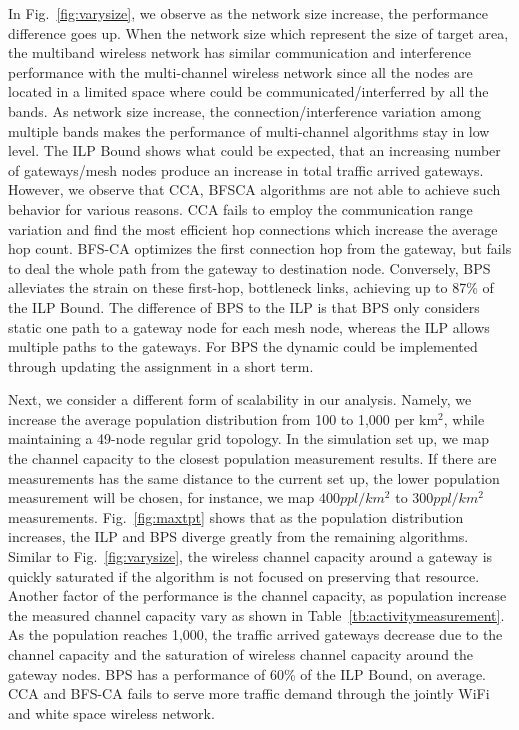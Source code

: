 In Fig.~\ref{fig:varysize}, we observe as the network size increase, the performance
difference goes up. When the network size which represent the size of target area, 
the multiband wireless network has similar communication and interference performance
with the multi-channel wireless network since all the nodes are located in a limited 
space where could be communicated/interferred by all the bands. As network size increase,
the connection/interference variation among multiple bands makes the performance of 
multi-channel algorithms stay in low level.
The ILP Bound shows what could be expected, that an 
increasing number of gateways/mesh nodes produce an increase in total
traffic arrived gateways.  
However, we observe that CCA, BFSCA algorithms are not able
to achieve such behavior for various reasons. CCA fails to employ the 
communication range variation and find the most efficient hop connections 
which increase the average hop count.  
BFS-CA optimizes the first connection hop from the gateway, but fails
to deal the whole path from the gateway to destination node.
Conversely, BPS alleviates the strain on these first-hop, bottleneck 
links, achieving up to 87\% of the ILP Bound. The difference of BPS to the
ILP is that BPS only considers static one path to a gateway node for each mesh node,
whereas the ILP allows multiple paths to the gateways. For BPS the dynamic could
be implemented through updating the assignment in a short term.

Next, we consider a different form of scalability in our analysis.  Namely,
we increase the average population distribution from 100 to 1,000 per km$^2$, while
maintaining a 49-node regular grid topology. 
In the simulation set up, we map the channel capacity to the closest population
measurement results. If there are measurements has the same distance to the current
set up, the lower population measurement will be chosen, for instance, we map 
$400 ppl/km^2$ to $300 ppl/km^2$ measurements.
Fig.~\ref{fig:maxtpt} shows that as the population distribution increases, the ILP
and BPS diverge greatly from the remaining algorithms. 
Similar to Fig.~\ref{fig:varysize}, the wireless channel capacity around a gateway is quickly 
saturated if the algorithm is not focused on preserving that resource. 
Another factor of the performance is the channel capacity, as population increase
the measured channel capacity vary as shown in Table~\ref{tb:activitymeasurement}.
As the population reaches 1,000, the traffic arrived gateways decrease due to the 
channel capacity and the saturation of wireless channel capacity around the gateway
nodes. BPS has a performance of 60\% of the ILP Bound, on average. CCA and BFS-CA
fails to serve more traffic demand through the jointly WiFi and white space wireless
network. 


